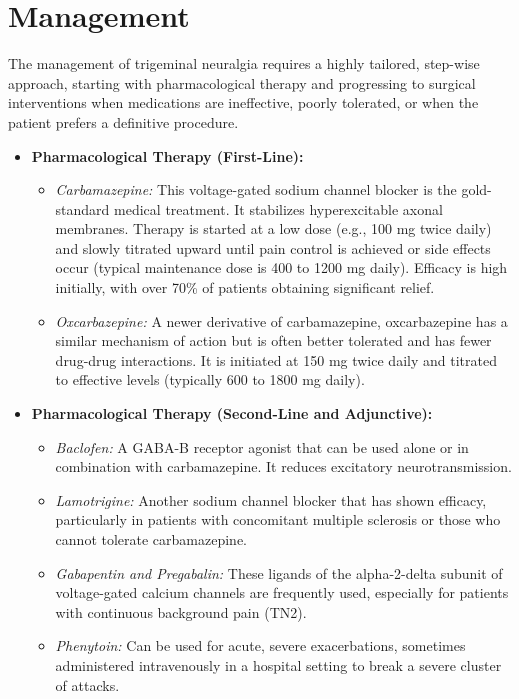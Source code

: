 \section*{Management}
The management of trigeminal neuralgia requires a highly tailored, step-wise approach, starting with pharmacological therapy and progressing to surgical interventions when medications are ineffective, poorly tolerated, or when the patient prefers a definitive procedure.
\begin{itemize}
  \item \textbf{Pharmacological Therapy (First-Line):}
  \begin{itemize}
    \item \textit{Carbamazepine:} This voltage-gated sodium channel blocker is the gold-standard medical treatment. It stabilizes hyperexcitable axonal membranes. Therapy is started at a low dose (e.g., 100 mg twice daily) and slowly titrated upward until pain control is achieved or side effects occur (typical maintenance dose is 400 to 1200 mg daily). Efficacy is high initially, with over 70\% of patients obtaining significant relief.
    \item \textit{Oxcarbazepine:} A newer derivative of carbamazepine, oxcarbazepine has a similar mechanism of action but is often better tolerated and has fewer drug-drug interactions. It is initiated at 150 mg twice daily and titrated to effective levels (typically 600 to 1800 mg daily).
  \end{itemize}
  \item \textbf{Pharmacological Therapy (Second-Line and Adjunctive):}
  \begin{itemize}
    \item \textit{Baclofen:} A GABA-B receptor agonist that can be used alone or in combination with carbamazepine. It reduces excitatory neurotransmission.
    \item \textit{Lamotrigine:} Another sodium channel blocker that has shown efficacy, particularly in patients with concomitant multiple sclerosis or those who cannot tolerate carbamazepine.
    \item \textit{Gabapentin and Pregabalin:} These ligands of the alpha-2-delta subunit of voltage-gated calcium channels are frequently used, especially for patients with continuous background pain (TN2).
    \item \textit{Phenytoin:} Can be used for acute, severe exacerbations, sometimes administered intravenously in a hospital setting to break a severe cluster of attacks.
  \end{itemize}

\end{itemize}
